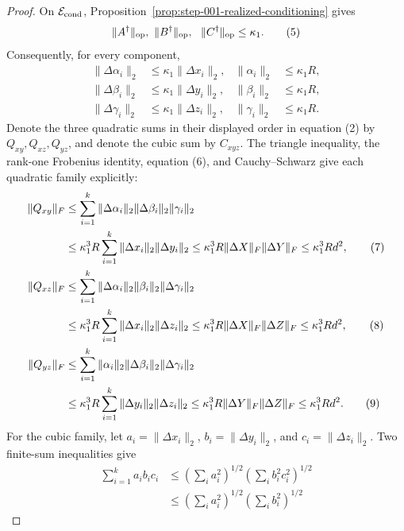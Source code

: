 \begin{proof}
On \(\mathcal E_{\rm cond}\), Proposition~\ref{prop:step-001-realized-conditioning} gives
\[
  \|A^\dagger\|_{\rm op},\ \|B^\dagger\|_{\rm op},\
  \ \|C^\dagger\|_{\rm op}\le\kappa_1.                   \tag{5}
\]
Consequently, for every component,
\[
\begin{aligned}
  \|\Delta\alpha_i\|_2&\le\kappa_1\|\Delta x_i\|_2,
  &\|\alpha_i\|_2&\le\kappa_1R,\\
  \|\Delta\beta_i\|_2&\le\kappa_1\|\Delta y_i\|_2,
  &\|\beta_i\|_2&\le\kappa_1R,\\
  \|\Delta\gamma_i\|_2&\le\kappa_1\|\Delta z_i\|_2,
  &\|\gamma_i\|_2&\le\kappa_1R.
\end{aligned}\tag{6}
\]
Denote the three quadratic sums in their displayed order in equation (2) by
\(Q_{xy},Q_{xz},Q_{yz}\), and denote the cubic sum by \(C_{xyz}\). The
triangle inequality, the rank-one Frobenius identity, equation (6), and
Cauchy--Schwarz give each quadratic family explicitly:
\begin{align}
  \|Q_{xy}\|_F
  &\le\sum_{i=1}^k
       \|\Delta\alpha_i\|_2\|\Delta\beta_i\|_2\|\gamma_i\|_2\notag\\
  &\le\kappa_1^3R
       \sum_{i=1}^k\|\Delta x_i\|_2\|\Delta y_i\|_2
   \le\kappa_1^3R\|\Delta X\|_F\|\Delta Y\|_F
   \le\kappa_1^3Rd^2,                                    \tag{7}\\
  \|Q_{xz}\|_F
  &\le\sum_{i=1}^k
       \|\Delta\alpha_i\|_2\|\beta_i\|_2\|\Delta\gamma_i\|_2\notag\\
  &\le\kappa_1^3R
       \sum_{i=1}^k\|\Delta x_i\|_2\|\Delta z_i\|_2
   \le\kappa_1^3R\|\Delta X\|_F\|\Delta Z\|_F
   \le\kappa_1^3Rd^2,                                    \tag{8}\\
  \|Q_{yz}\|_F
  &\le\sum_{i=1}^k
       \|\alpha_i\|_2\|\Delta\beta_i\|_2\|\Delta\gamma_i\|_2\notag\\
  &\le\kappa_1^3R
       \sum_{i=1}^k\|\Delta y_i\|_2\|\Delta z_i\|_2
   \le\kappa_1^3R\|\Delta Y\|_F\|\Delta Z\|_F
   \le\kappa_1^3Rd^2.                                    \tag{9}
\end{align}
For the cubic family, let
\(a_i=\|\Delta x_i\|_2\),
\(b_i=\|\Delta y_i\|_2\), and
\(c_i=\|\Delta z_i\|_2\). Two finite-sum inequalities give
\[
\begin{aligned}
  \sum_{i=1}^k a_ib_ic_i
  &\le\left(\sum_i a_i^2\right)^{1/2}
       \left(\sum_i b_i^2c_i^2\right)^{1/2}\\
  &\le\left(\sum_i a_i^2\right)^{1/2}
       \left(\sum_i b_i^2\right)^{1/2}

\end{aligned}\]
\end{proof}
